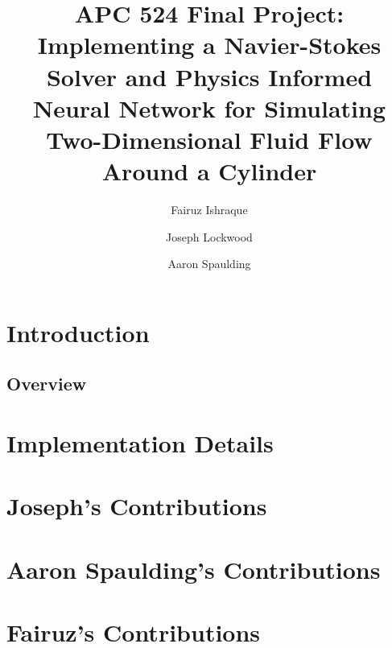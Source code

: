 \documentclass[11pt, letterpaper]{article}
\title{\titlefontlarge APC 524 Final Project:\\\titlefont Implementing a Navier-Stokes Solver and Physics Informed Neural Network for Simulating Two-Dimensional Fluid Flow Around a Cylinder}
\author[1]{Fairuz Ishraque}
\author[1]{Joseph Lockwood}
\author[2]{Aaron Spaulding}
\affil[1]{Department of Geosciences}
\affil[2]{Department of Civil and Environmental Engineering}
\date{}
\begin{document}
\maketitle
\newpage 
\tableofcontents

\newpage


\section{Introduction}

\subsection{Overview}


\section{Implementation Details}





\section{Joseph's Contributions}


\newpage
\section{Aaron Spaulding's Contributions}


\section{Fairuz's Contributions}

\newpage
\printbibliography
\end{document}
